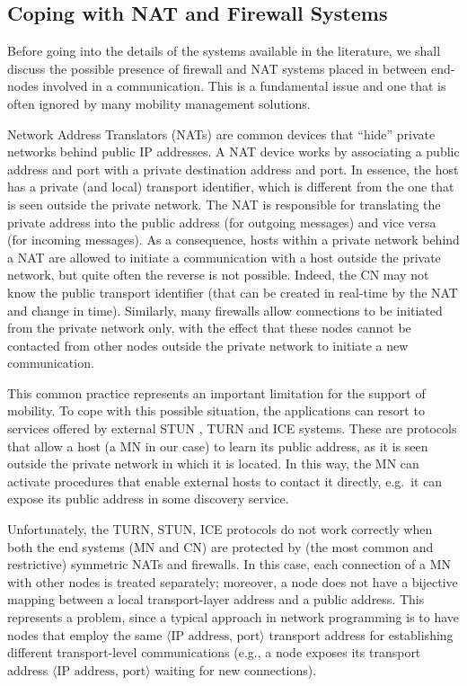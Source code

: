 \documentclass[preprint,12pt]{elsarticle}
\begin{document}
\subsection{Coping with NAT and Firewall Systems}

Before going into the details of the systems available in the literature, we shall discuss the possible presence of firewall and NAT systems placed in between end-nodes involved in a communication. 
This is a fundamental issue and one that is often ignored by many mobility management solutions.

Network Address Translators (NATs) are common devices that ``hide'' private 
networks behind public IP addresses.
A NAT device works by associating a public address and port with a private 
destination address and port. In essence, the host has a private (and local) 
transport identifier, which is different from the one that is seen outside the private 
network. The NAT is responsible for translating the private 
address into the public address (for outgoing messages) and vice versa (for 
incoming messages). As a consequence, hosts within a private network behind a 
NAT are allowed to initiate a communication with a host outside the private 
network, but quite often the reverse is not possible. Indeed, the CN may not 
know the public transport identifier (that can be created in real-time by 
the NAT and change in time).
Similarly, many firewalls allow connections to be initiated from the private 
network only, with the effect that these nodes cannot be contacted from other nodes outside the private network
to initiate a new communication. 

This common practice represents an important limitation for the support of 
mobility.
To cope with this possible situation, the applications can resort to services offered 
by external \ac{STUN} \cite{STUN}, \ac{TURN} \cite{TURN} and \ac{ICE} \cite{ice} systems. These 
are protocols that allow a host (a MN in our case) to learn its public address, 
as it is seen outside the private network in which it is located.
In this way, the MN can activate procedures that enable external hosts to contact 
it directly, e.g.~it can expose its public address in some discovery service.  

Unfortunately, the TURN, STUN, ICE protocols do not work correctly when both the 
end systems (MN and CN) are protected by (the most common and restrictive) 
symmetric NATs and firewalls. 
In this case, each connection of a MN with other nodes is treated separately; 
moreover, a node does not have a bijective mapping between a local 
transport-layer address and a public address.
This represents a problem, since a typical approach in network programming is to 
have nodes that 
employ the same $\langle\text{IP address, port}\rangle$ transport address for 
establishing different transport-level communications (e.g., a node exposes its 
transport address $\langle\text{IP address, port}\rangle$ waiting for new 
connections).
\end{document}
